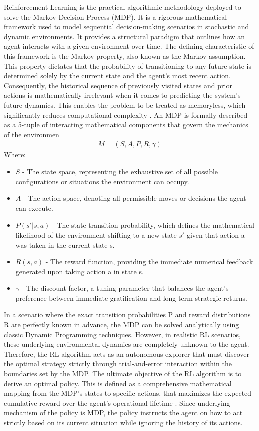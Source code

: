 Reinforcement Learning is the practical algorithmic methodology deployed to solve the Markov Decision Process (MDP).
It is a rigorous mathematical framework used to model sequential decision-making scenarios in stochastic and dynamic environments. It provides a structural paradigm that outlines how an agent interacts with a given environment over time. The defining characteristic of this framework is the Markov property, also known as the Markov assumption. This property dictates that the probability of transitioning to any future state is determined solely by the current state and the agent's most recent action. Consequently, the historical sequence of previously visited states and prior actions is mathematically irrelevant when it comes to predicting the system's future dynamics. This enables the problem to be treated as memoryless, which significantly reduces computational complexity \cite{NaeemMuddasar2020AGIt}.
An MDP is formally described as a 5-tuple of interacting mathematical components that govern the mechanics of the environmen \cite{HwangHyo-Seok2025GASA}
	\begin{align}
	M =( S, A, P, R, \gamma)
\end{align}
Where:
\begin{itemize}
	\item $S$ - The state space, representing the exhaustive set of all possible configurations or situations the environment can occupy.
	\item $A$ - The action space, denoting all permissible moves or decisions the agent can execute.
	\item $P(s'|s,a)$ - The state transition probability, which defines the mathematical likelihood of the environment shifting to a new state $s'$ given that action a was taken in the current state s.
	\item $R(s,a)$ - The reward function, providing the immediate numerical feedback generated upon taking action a in state s.
	\item $\gamma$ - The discount factor, a tuning parameter that balances the agent's preference between immediate gratification and long-term strategic returns.
\end{itemize}
In a scenario where the exact transition probabilities P and reward distributions R are perfectly known in advance, the MDP can be solved analytically using classic Dynamic Programming techniques. However, in realistic RL scenarios, these underlying environmental dynamics are completely unknown to the agent. Therefore, the RL algorithm acts as an autonomous explorer that must discover the optimal strategy strictly through trial-and-error interaction within the boundaries set by the MDP.
 The ultimate objective of the RL algorithm is to derive an optimal policy. This is defined as a comprehensive mathematical mapping from the MDP's states to specific actions, that maximizes the expected cumulative reward over the agent's operational lifetime \cite{NaeemMuddasar2020AGIt}. Since underlying mechanism of the policy is MDP, the policy instructs the agent on how to act strictly based on its current situation while ignoring the history of its actions.

